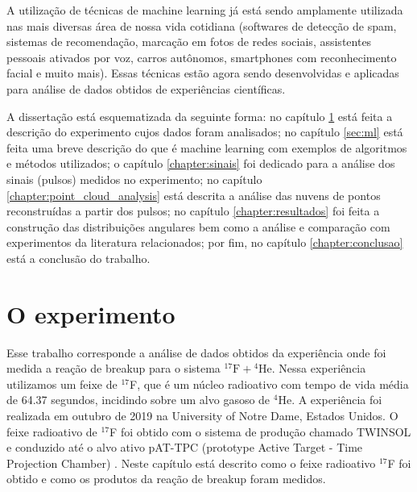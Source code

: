 \documentclass[a4paper,12pt,oneside]{book}
\begin{document}

\par A utilização de técnicas de machine learning já está sendo amplamente utilizada nas mais diversas área de nossa vida cotidiana (softwares de detecção de spam, sistemas de recomendação, marcação em fotos de redes sociais, assistentes pessoais ativados por voz, carros autônomos, smartphones com reconhecimento facial e muito mais). Essas técnicas estão agora sendo desenvolvidas e aplicadas para análise de dados obtidos de experiências científicas.

\par A dissertação está esquematizada da seguinte forma: no capítulo \ref{PATTPC} está feita a descrição do experimento cujos dados foram analisados; no capítulo \ref{sec:ml} está feita uma breve descrição do que é machine learning com exemplos de algoritmos e métodos utilizados; o capítulo \ref{chapter:sinais} foi dedicado para a análise dos sinais (pulsos) medidos no experimento; no capítulo \ref{chapter:point_cloud_analysis} está descrita a análise das nuvens de pontos reconstruídas a partir dos pulsos; no capítulo \ref{chapter:resultados} foi feita a construção das distribuições angulares bem como a análise e comparação com experimentos da literatura relacionados; por fim, no capítulo \ref{chapter:conclusao} está a conclusão do trabalho.

\chapter{O experimento}\label{PATTPC}


\par Esse trabalho corresponde a análise de dados obtidos da experiência onde foi medida a reação de breakup para o sistema ${}^{17}\mathrm{F}+{}^{4}\mathrm{He}$. Nessa experiência utilizamos um feixe de $^{17}$F, que é um núcleo radioativo com tempo de vida média de 64.37 segundos, incidindo sobre um alvo gasoso de $^{4}$He. A experiência foi realizada em outubro de 2019 na University of Notre Dame, Estados Unidos. O feixe radioativo de $^{17}$F foi obtido com o sistema de produção chamado TWINSOL \cite{twinsol} e conduzido até o alvo ativo pAT-TPC (prototype Active Target - Time Projection Chamber) \cite{pattpc}. Neste capítulo está descrito como o feixe radioativo ${}^{17}$F foi obtido e como os produtos da reação de breakup foram medidos.
\end{document}
